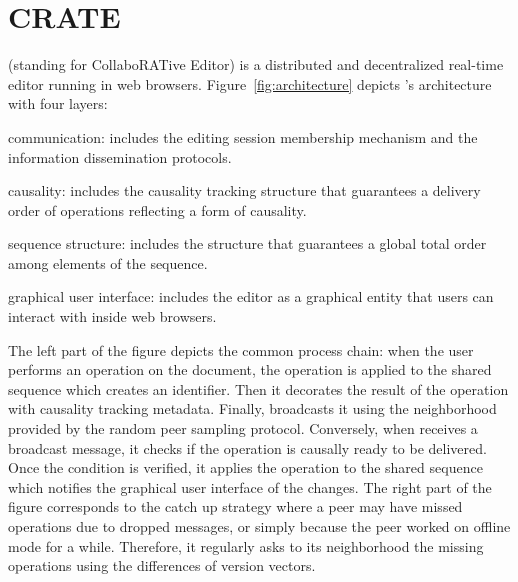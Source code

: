 
\section{CRATE}
\label{sec:proposal}

\CRATE (standing for CollaboRATive Editor) is a distributed and decentralized
real-time editor running in web browsers.  Figure~\ref{fig:architecture} depicts
\CRATE's architecture with four layers:
\begin{inparaenum}[(i)]
\item communication: includes the editing session membership mechanism and the
  information dissemination protocols.
\item causality: includes the causality tracking structure that guarantees a
  delivery order of operations reflecting a form of causality.
\item sequence structure: includes the structure that guarantees a global
  total order among elements of the sequence.
\item graphical user interface: includes the editor as a graphical entity that
  users can interact with inside web browsers.
\end{inparaenum}
The left part of the figure depicts the common process chain: when the user
performs an operation on the document, the operation is applied to the shared
sequence which creates an \LSEQ identifier. Then it decorates the result of the
operation with causality tracking metadata. Finally, \CRATE broadcasts it using
the neighborhood provided by the \SPRAY random peer sampling protocol.
Conversely, when \CRATE receives a broadcast message, it checks if the operation
is causally ready to be delivered. Once the condition is verified, it applies
the operation to the shared sequence which notifies the graphical user interface
of the changes.  The right part of the figure corresponds to the catch up
strategy where a peer may have missed operations due to dropped messages, or
simply because the peer worked on offline mode for a while. Therefore, it
regularly asks to its neighborhood the missing operations using the differences
of version vectors.



